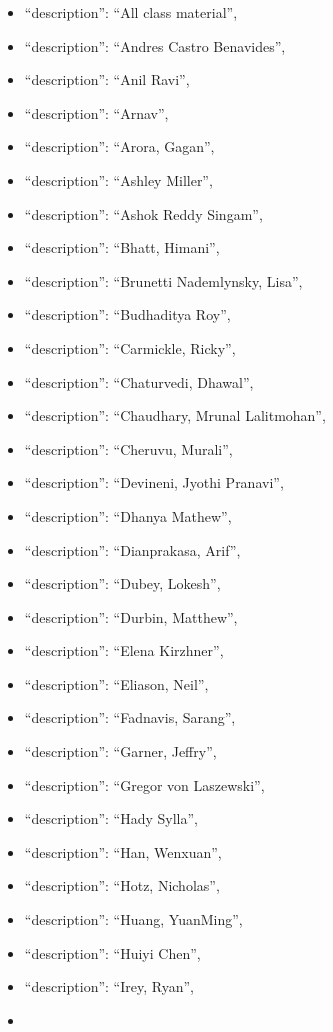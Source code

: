 \begin{itemize}
\item
  ``description'': ``All class material'',
\item
  ``description'': ``Andres Castro Benavides'',
\item
  ``description'': ``Anil Ravi'',
\item
  ``description'': ``Arnav'',
\item
  ``description'': ``Arora, Gagan'',
\item
  ``description'': ``Ashley Miller'',
\item
  ``description'': ``Ashok Reddy Singam'',
\item
  ``description'': ``Bhatt, Himani'',
\item
  ``description'': ``Brunetti Nademlynsky, Lisa'',
\item
  ``description'': ``Budhaditya Roy'',
\item
  ``description'': ``Carmickle, Ricky'',
\item
  ``description'': ``Chaturvedi, Dhawal'',
\item
  ``description'': ``Chaudhary, Mrunal Lalitmohan'',
\item
  ``description'': ``Cheruvu, Murali'',
\item
  ``description'': ``Devineni, Jyothi Pranavi'',
\item
  ``description'': ``Dhanya Mathew'',
\item
  ``description'': ``Dianprakasa, Arif'',
\item
  ``description'': ``Dubey, Lokesh'',
\item
  ``description'': ``Durbin, Matthew'',
\item
  ``description'': ``Elena Kirzhner'',
\item
  ``description'': ``Eliason, Neil'',
\item
  ``description'': ``Fadnavis, Sarang'',
\item
  ``description'': ``Garner, Jeffry'',
\item
  ``description'': ``Gregor von Laszewski'',
\item
  ``description'': ``Hady Sylla'',
\item
  ``description'': ``Han, Wenxuan'',
\item
  ``description'': ``Hotz, Nicholas'',
\item
  ``description'': ``Huang, YuanMing'',
\item
  ``description'': ``Huiyi Chen'',
\item
  ``description'': ``Irey, Ryan'',
\item

\end{itemize}
